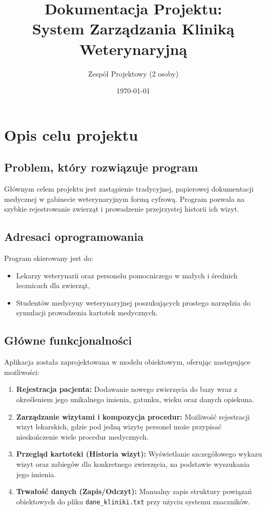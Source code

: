 \documentclass[12pt,a4paper]{article}
\title{Dokumentacja Projektu:\\System Zarządzania Kliniką Weterynaryjną}
\author{Zespół Projektowy (2 osoby)}
\date{\today}
\begin{document}
\section{Opis celu projektu}

\subsection{Problem, który rozwiązuje program}
Głównym celem projektu jest zastąpienie tradycyjnej, papierowej dokumentacji medycznej w gabinecie weterynaryjnym formą cyfrową. Program pozwala na szybkie rejestrowanie zwierząt i prowadzenie przejrzystej historii ich wizyt.

\subsection{Adresaci oprogramowania}
Program skierowany jest do:
\begin{itemize}
    \item Lekarzy weterynarii oraz personelu pomocniczego w małych i średnich lecznicach dla zwierząt,
    \item Studentów medycyny weterynaryjnej poszukujących prostego narzędzia do symulacji prowadzenia kartotek medycznych.
\end{itemize}

\subsection{Główne funkcjonalności}
Aplikacja została zaprojektowana w modelu obiektowym, oferując następujące możliwości:
\begin{enumerate}
    \item \textbf{Rejestracja pacjenta:} Dodawanie nowego zwierzęcia do bazy wraz z określeniem jego unikalnego imienia, gatunku, wieku oraz danych opiekuna.
    \item \textbf{Zarządzanie wizytami i kompozycja procedur:} Możliwość rejestracji wizyt lekarskich, gdzie pod jedną wizytę personel może przypisać nieskończenie wiele procedur medycznych.
    \item \textbf{Przegląd kartoteki (Historia wizyt):} Wyświetlanie szczegółowego wykazu wizyt oraz zabiegów dla konkretnego zwierzęcia, na podstawie wyszukania jego imienia.
    \item \textbf{Trwałość danych (Zapis/Odczyt):} Manualny zapis struktury powiązań obiektowych do pliku \texttt{dane\_kliniki.txt} przy użyciu systemu znaczników.
\end{enumerate}
\end{document}
